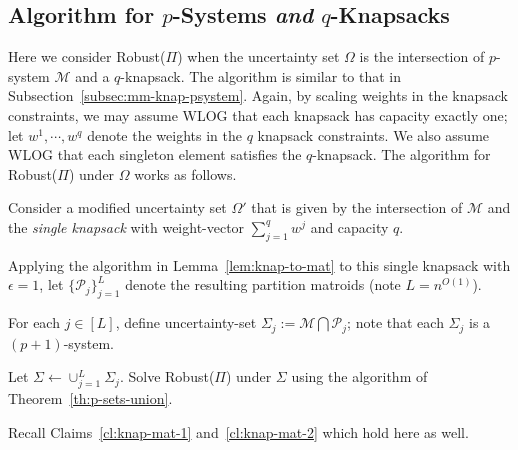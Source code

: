 \documentclass[11pt,letterpaper]{article}
\def\p {\ensuremath{\mathcal{P}}\xspace}
\def\ms{\ensuremath{\mathcal{M}}\xspace}
\def\cov{\ensuremath{\Pi}\xspace}
\def\rcov{{\sf Robust(\cov)}\xspace}
\newcounter{note}[section]
\begin{document}
\subsection{Algorithm for $p$-Systems {\em and } $q$-Knapsacks }
Here we consider \rcov when the uncertainty set $\Omega$ is the intersection of   $p$-system \ms and a $q$-knapsack.
The algorithm is similar to that in Subsection~\ref{subsec:mm-knap-psystem}. Again, by scaling weights in the knapsack
constraints, we may assume WLOG that each knapsack has capacity exactly one; let $w^1,\cdots,w^q$ denote the weights in
the $q$ knapsack constraints. We also assume WLOG that each singleton element satisfies the $q$-knapsack. The algorithm
for \rcov under $\Omega$ works as follows.

\begin{algorithm}
\caption{Algorithm Robust with $p$-system and $q$-knapsack Uncertainty Set}
  \begin{algorithmic}[1]
  \STATE Consider a modified uncertainty set $\Omega'$ that is given by the intersection of \ms and the {\em single knapsack}
with weight-vector $\sum_{j=1}^q w^j$ and capacity $q$.

  \STATE Applying the algorithm in Lemma~\ref{lem:knap-to-mat} to  this single knapsack with $\epsilon=1$, let
$\{\p_j\}_{j=1}^L$ denote the resulting partition matroids (note $L=n^{O(1)}$).

  \STATE For each $j\in [L]$, define uncertainty-set $\Sigma_j := \ms\bigcap \p_j$; note that each $\Sigma_j$ is a
$(p+1)$-system.

  \STATE Let  $\Sigma\gets \cup_{j=1}^L \Sigma_j$. Solve \rcov under $\Sigma$ using the algorithm of
  Theorem~\ref{th:p-sets-union}.
\end{algorithmic}
\end{algorithm}

Recall Claims~\ref{cl:knap-mat-1} and~\ref{cl:knap-mat-2} which hold here as well.
\end{document}
